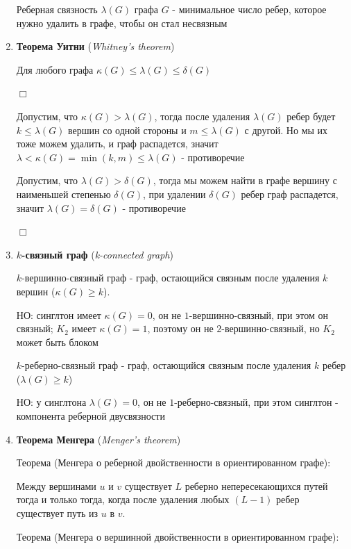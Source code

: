 \documentclass[12pt]{article}
\begin{document}
\begin{enumerate}
        Реберная связность $\lambda(G)$ графа $G$ - минимальное число ребер, которое нужно удалить в графе, чтобы он стал несвязным

        \item \textbf{Теорема Уитни} (\textit{Whitney's theorem})

        Для любого графа $\kappa(G) \leq \lambda(G) \leq \delta(G)$

        $\Box$

        Допустим, что $\kappa(G) > \lambda(G)$, тогда после удаления $\lambda(G)$ ребер будет $k \leq \lambda(G)$ вершин со одной стороны и $m \leq \lambda(G)$ с другой.
        Но мы их тоже можем удалить, и граф распадется, значит $\lambda < \kappa(G) = \min (k, m) \leq \lambda(G)$ - противоречие

        Допустим, что $\lambda(G) > \delta(G)$, тогда мы можем найти в графе вершину с наименьшей степенью $\delta(G)$,
        при удалении $\delta(G)$ ребер граф распадется, значит $\lambda(G) = \delta(G)$ - противоречие

        $\Box$


        \item \textbf{$k$-связный граф} (\textit{k-connected graph})

        $k$-вершинно-связный граф - граф, остающийся связным после удаления $k$ вершин ($\kappa(G) \geq k$).

        НО: синглтон имеет $\kappa(G) = 0$, он не $1$-вершинно-связный, при этом он связный; $K_2$ имеет $\kappa(G) = 1$,
        поэтому он не $2$-вершинно-связный, но $K_2$ может быть блоком

        $k$-реберно-связный граф - граф, остающийся связным после удаления $k$ ребер ($\lambda(G) \geq k$)

        НО: у синглтона $\lambda(G) = 0$, он не $1$-реберно-связный, при этом синглтон - компонента реберной двусвязности

        \item \textbf{Теорема Менгера} (\textit{Menger's theorem})

        Теорема (Менгера о реберной двойственности в ориентированном графе):

        Между вершинами $u$ и $v$ существует $L$ реберно непересекающихся путей тогда и только тогда,
        когда после удаления любых $(L - 1)$ ребер существует путь из $u$ в $v$.

        Теорема (Менгера о вершинной двойственности в ориентированном графе):


\end{enumerate}
\end{document}
